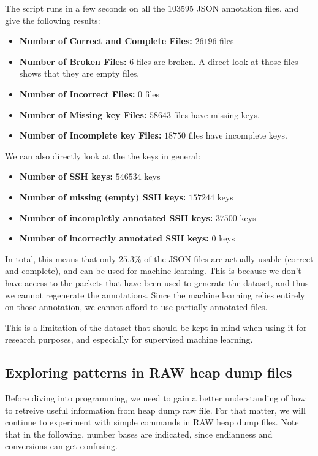     The script runs in a few seconds on all the $103595$ JSON annotation files, and give the following results:

    \begin{itemize}
        \item \textbf{Number of Correct and Complete Files:} $ 26196 $ files 
        \item \textbf{Number of Broken Files:} $ 6 $ files are broken. A direct look at those files shows that they are empty files.
        \item \textbf{Number of Incorrect Files:} $ 0 $ files
        \item \textbf{Number of Missing key Files:} $ 58643 $ files have missing keys.
        \item \textbf{Number of Incomplete key Files:} $ 18750 $ files have incomplete keys.
    \end{itemize}

    We can also directly look at the the keys in general:

    \begin{itemize}
        \item \textbf{Number of SSH keys:} $546534$ keys
        \item \textbf{Number of missing (empty) SSH keys:} $157244$ keys
        \item \textbf{Number of incompletly annotated SSH keys:} $37500$ keys
        \item \textbf{Number of incorrectly annotated SSH keys:} $0$ keys
    \end{itemize}

    In total, this means that only $25.3\% $ of the JSON files are actually usable (correct and complete), and can be used for machine learning. This is because we don't have access to the packets that have been used to generate the dataset, and thus we cannot regenerate the annotations. Since the machine learning relies entirely on those annotation, we cannot afford to use partially annotated files. 
    
    This is a limitation of the dataset that should be kept in mind when using it for research purposes, and especially for supervised machine learning.

    \subsection{Exploring patterns in RAW heap dump files}
    Before diving into programming, we need to gain a better understanding of how to retreive useful information from heap dump raw file. For that matter, we will continue to experiment with simple commands in RAW heap dump files. Note that in the following, number bases are indicated, since endianness and conversions can get confusing.


